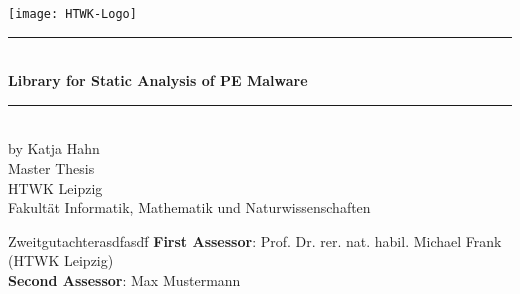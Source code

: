\thispagestyle{empty}

\newlength{\oldtextwidth}		\setlength{\oldtextwidth}{\textwidth}
\newlength{\oldmarginparwidth}	\setlength{\oldmarginparwidth}{\marginparwidth}
\newlength{\oldparskip}			\setlength{\oldparskip}{\parskip}
\newlength{\oldparindent}		\setlength{\oldparindent}{\parindent}
\newlength{\oldhoffset}			\setlength{\oldhoffset}{\hoffset}

\setlength{\parskip}{0pt}
\setlength{\parindent}{0pt}

\begin{titlepage}
	\hfill{}
	\begin{minipage}{0.3\textwidth}
		\begin{flushright}
			\texttt{[image: HTWK-Logo]}\\[0cm]
		\end{flushright}
	\end{minipage}
	\vspace{1cm}
	\begin{center}
		\rule{\textwidth}{1.5pt}\\[0.5cm]
		{\Huge\bfseries Library for Static Analysis of PE Malware}\\[0.5cm]
		\rule{\textwidth}{1.5pt}\\[1cm]
		{\Large by Katja Hahn}\\[1cm]
		{\Huge Master Thesis}\\[1cm]
		{\Large HTWK Leipzig}\\[0.75cm]
		{\Large Fakultät Informatik, Mathematik und Naturwissenschaften}\\[2cm]
	\end{center}
	\begin{tabbing}
		Zweitgutachterasdfasdf\=\kill
		{\bfseries First Assessor}: \>Prof. Dr. rer. nat. habil. Michael Frank (HTWK Leipzig)\\[0cm]
		{\bfseries Second Assessor}: \>Max Mustermann\\[1cm]
	\end{tabbing}
\end{titlepage}

\setlength{\textwidth}{\oldtextwidth}
\setlength{\marginparwidth}{\oldmarginparwidth}
\setlength{\parskip}{\oldparskip}
\setlength{\parindent}{\oldparindent}
\setlength{\hoffset}{\oldhoffset}
